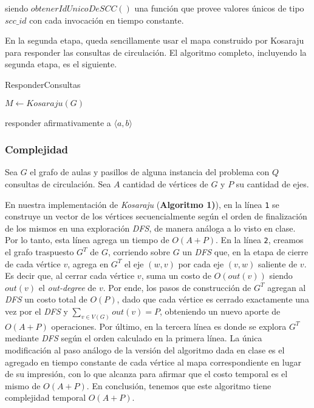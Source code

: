\medskip

siendo $obtenerIdUnicoDeSCC()$ una función que provee valores únicos de tipo $scc\_id$ con cada invocación en tiempo constante.

\medskip

En la segunda etapa, queda sencillamente usar el mapa construido por Kosaraju para responder las consultas de circulación. El algoritmo completo, incluyendo la segunda etapa, es el siguiente.

\bigskip

\begin{algorithm}[H]
	\caption{ResponderConsultas}

    $M \gets \mathit{Kosaraju(G)}$ \;

     {
         {
            responder afirmativamente a $\langle a, b \rangle$
        } 
    }
\end{algorithm}

\subsubsection{Complejidad}

Sea $G$ el grafo de aulas y pasillos de alguna instancia del problema con $Q$ consultas de circulación. Sea $A$ cantidad de vértices de $G$ y $P$ su cantidad de ejes.

En nuestra implementación de \textit{Kosaraju} (\textbf{Algoritmo 1)}), en la línea \texttt{1} se construye un vector de los vértices secuencialmente según el orden de finalización de los mismos en una exploración \textit{DFS}, de manera análoga a lo visto en clase. Por lo tanto, esta línea agrega un tiempo de $O(A+P)$. En la línea \texttt{2}, creamos el grafo traspuesto $G^T$ de $G$, corriendo sobre $G$ un \textit{DFS} que, en la etapa de cierre de cada vértice $v$, agrega en $G^T$ el eje $(w,v)$ por cada eje $(v,w)$ saliente de $v$. Es decir que, al cerrar cada vértice $v$, suma un costo de $O(out(v))$ siendo $out(v)$ el \textit{out-degree} de $v$. Por ende, los pasos de construcción de $G^T$ agregan al \textit{DFS} un costo total de $O(P)$, dado que cada vértice es cerrado exactamente una vez por el \textit{DFS} y $\sum\limits_{v \in V(G)} out(v) = P$, obteniendo un nuevo aporte de $O(A+P)$ operaciones. Por último, en la tercera línea es donde se explora $G^T$ mediante \textit{DFS} según el orden calculado en la primera línea. La única modificación al paso análogo de la versión del algoritmo dada en clase es el agregado en tiempo constante de cada vértice al mapa correspondiente en lugar de su impresión, con lo que alcanza para afirmar que el costo temporal es el mismo de $O(A+P)$. En conclusión, tenemos que este algoritmo tiene complejidad temporal $O(A+P)$.

